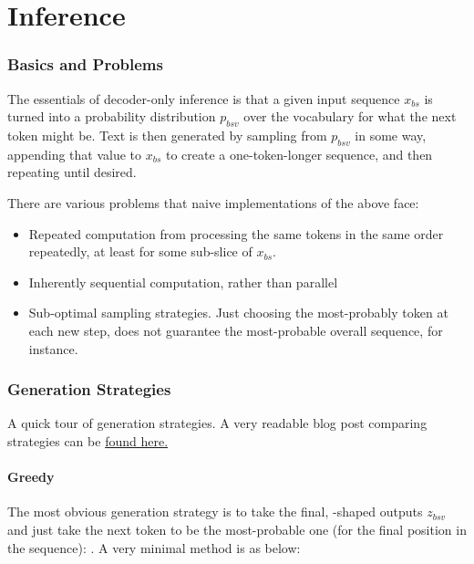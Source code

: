 \documentclass[11pt]{article}
\begin{document}
\part{Inference}


\section{Basics and Problems}


The essentials of decoder-only inference is that a given input sequence $ x _{ bs } $ is turned into
a probability distribution $ p _{ bsv } $ over the vocabulary for what the next token might be.  Text
is then generated by sampling from $ p _{ bsv } $ in some way, appending that value to $ x _{ bs } $
to create a one-token-longer sequence, and then repeating until desired.

There are various problems that naive implementations of the above face:
\begin{itemize}
    \item Repeated computation from processing the same tokens in the same order repeatedly, at least for
        some sub-slice of $ x _{ bs } $.
    \item Inherently sequential computation, rather than parallel
    \item Sub-optimal sampling strategies. Just choosing the most-probably token at each new step, does
    not guarantee the most-probable overall sequence, for instance.
\end{itemize}



\section{Generation Strategies \label{sec_generation_strats} }

A quick tour of generation strategies. A very readable blog post comparing strategies can be
\href{https://huggingface.co/blog/how-to-generate}{found here.}


\subsection{Greedy \label{subsec_greedy_gen}}

The most obvious generation strategy is to take the final, -shaped outputs $ z
_{ bsv } $ and just take the next token to be the most-probable one (for the final position in the
sequence): . A very minimal  method
is as below:
\end{document}
